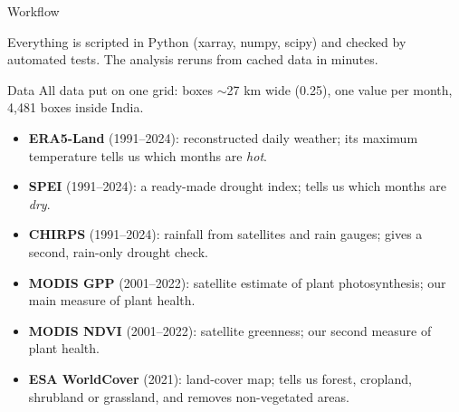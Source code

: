 \documentclass[aspectratio=169,xcolor=table]{beamer}
\begin{document}
\begin{frame}{Workflow}
\centering
{}

\vspace{10pt}
\footnotesize Everything is scripted in Python (xarray, numpy, scipy) and checked by
automated tests. The analysis reruns from cached data in minutes.
\end{frame}

\begin{frame}{Data}
\small
All data put on one grid: boxes $\sim$27 km wide (0.25\textdegree), one value
per month, 4,481 boxes inside India.
\vspace{4pt}
\begin{itemize}
  \item \textbf{ERA5-Land} (1991--2024): reconstructed daily weather; its
    maximum temperature tells us which months are \emph{hot}.
  \item \textbf{SPEI} (1991--2024): a ready-made drought index; tells us
    which months are \emph{dry}.
  \item \textbf{CHIRPS} (1991--2024): rainfall from satellites and rain
    gauges; gives a second, rain-only drought check.
  \item \textbf{MODIS GPP} (2001--2022): satellite estimate of plant
    photosynthesis; our main measure of plant health.
  \item \textbf{MODIS NDVI} (2001--2022): satellite greenness; our second
    measure of plant health.
  \item \textbf{ESA WorldCover} (2021): land-cover map; tells us forest,
    cropland, shrubland or grassland, and removes non-vegetated areas.
\end{itemize}
\vspace{4pt}
\end{frame}
\end{document}
